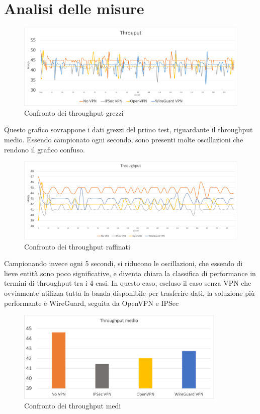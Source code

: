 \section{Analisi delle misure}
\begin{figure}[ht]
    \centering
    \includegraphics[width=14cm]{figure/rawThroughput.png}
    \caption{Confronto dei throughput grezzi}
\end{figure}
Questo grafico sovrappone i dati grezzi del primo test, riguardante il throughput medio. Essendo campionato ogni secondo, sono presenti molte oscillazioni che rendono il grafico confuso.

\begin{figure}[ht]
    \centering
    \includegraphics[width=14cm]{figure/fineThroughput.png}
    \caption{Confronto dei throughput raffinati}
\end{figure}
Campionando invece ogni 5 secondi, si riducono le oscillazioni, che essendo di lieve entità sono poco significative, e diventa chiara la classifica di performance in termini di throughput tra i 4 casi.
In questo caso, escluso il caso senza VPN che ovviamente utilizza tutta la banda disponibile per trasferire dati, la soluzione più performante è WireGuard, seguita da OpenVPN e IPSec

\begin{figure}[ht]
    \centering
    \includegraphics[width=10cm]{figure/avg.png}
    \caption{Confronto dei throughput medi}
\end{figure}